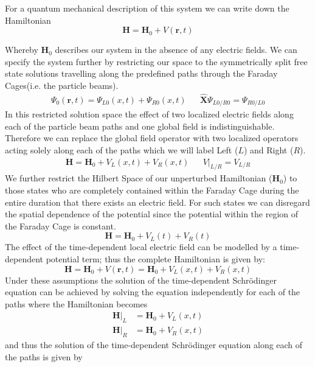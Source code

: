 \documentclass{article}
\begin{document}
For a quantum mechanical description of this system we can write down the Hamiltonian
\begin{equation*}
  \bm{H} = \bm{H}_{0} + V(\bm{r},t)
\end{equation*}

Whereby $\bm{H}_{0}$ describes our system in the absence of any electric fields. We can specify the system further by restricting our space to the symmetrically split free state solutions travelling along the predefined paths through the Faraday Cages(i.e. the particle beams).
\begin{align*}
  \Psi_{0}(\bm{r},t)=\Psi_{L0}(x,t) + \Psi_{R0}(x,t) && \hat{\bm{X}}\Psi_{L0/R0} = \Psi_{R0/L0}
\end{align*}
In this restricted solution space the effect of two localized electric fields along each of the particle beam paths and one global field is indistinguishable. Therefore we can replace the global field operator with two localized operators acting solely along each of the paths which we will label Left ($L$) and Right ($R$).
\begin{align*}
  \bm{H} = \bm{H}_{0} + V_{L}(x,t) + V_{R}(x,t) && V|_{L/R} = V_{L/R}
\end{align*}
We further restrict the Hilbert Space of our unperturbed Hamiltonian ($\bm{H}_{0}$) to those states who are completely contained within the Faraday Cage during the entire duration that there exists an electric field. For such states we can disregard the spatial dependence of the potential since the potential within the region of the Faraday Cage is constant.
\begin{equation*}
  \bm{H} = \bm{H}_{0} + V_{L}(t) + V_{R}(t)
\end{equation*}
The effect of the time-dependent local electric field can be modelled by a time-dependent potential term; thus the complete Hamiltonian is given by:
\begin{equation*}
  \bm{H} = \bm{H}_{0} + V(\bm{r}, t) = \bm{H}_{0} + V_{L}(x,t) + V_{R}(x,t)
\end{equation*}
Under these assumptions the solution of the time-dependent Schrödinger equation can be achieved by solving the equation independently for each of the paths where the Hamiltonian becomes
\begin{align*}
  \bm{H}|_{L} &= \bm{H}_{0} + V_{L}(x,t)\\
  \bm{H}|_{R} &= \bm{H}_{0} + V_{R}(x,t)
\end{align*}
and thus the solution of the time-dependent Schrödinger equation along each of the paths is given by
\end{document}
